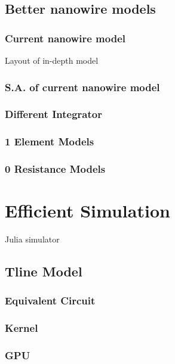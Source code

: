 \documentclass{article}
\begin{document}
\subsection{Better nanowire models}

\subsubsection{Current nanowire model}

Layout of in-depth model

\subsubsection{S.A. of current nanowire model}

\subsubsection{Different Integrator}

\subsubsection{1 Element Models}

\subsubsection{0 Resistance Models}

\section{Efficient Simulation}

Julia simulator

\subsection{Tline Model}

\subsubsection{Equivalent Circuit}

\subsubsection{Kernel}

\subsubsection{GPU}
\end{document}
